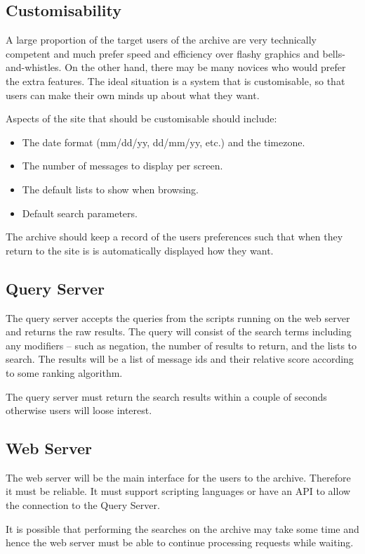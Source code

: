 \subsection{Customisability}
A large proportion of the target users of the archive are very technically
competent and much prefer speed and efficiency over flashy graphics and
bells-and-whistles.  On the other hand, there may be many novices who
would prefer the extra features.  The ideal situation is a system that is
customisable, so that users can make their own minds up about what they
want.

Aspects of the site that should be customisable should include:
\begin{itemize}
\item The date format (mm/dd/yy, dd/mm/yy, etc.) and the timezone.
\item The number of messages to display per screen.
\item The default lists to show when browsing.
\item Default search parameters.
\end{itemize}

The archive should keep a record of the users preferences such that when
they return to the site is is automatically displayed how they want.

\subsection{Query Server}
The query server accepts the queries from the scripts running on the web
server and returns the raw results.  The query will consist of the search
terms including any modifiers -- such as negation, the number of results
to return, and the lists to search.  The results will be a list of message
ids and their relative score according to some ranking algorithm.

The query server must return the search results within a couple of seconds
otherwise users will loose interest.

\subsection{Web Server}
The web server will be the main interface for the users to the archive.  
Therefore it must be reliable.  It must support scripting languages or
have an API to allow the connection to the Query Server.

It is possible that performing the searches on the archive may take some
time and hence the web server must be able to continue processing requests
while waiting.

